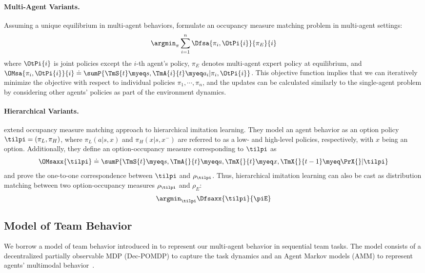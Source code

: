 \paragraph{Multi-Agent Variants.} 
Assuming a unique equilibrium in multi-agent behaviors, \citet{song2018multi} formulate an occupancy measure matching problem in multi-agent settings:
\begin{align}
   \argmin_{\pi}\sum_{i=1}^n\Dfsa{\pi_i,\OtPi{i}}{\pi_{E}}{i}  \label{eq. MAIL objective}
\end{align}
where $\OtPi{i}$ is joint policies except the $i$-th agent's policy, $\pi_E$ denotes multi-agent expert policy at equilibrium, and $\OMsa{\pi_i,\OtPi{i}}{i} \doteq \sumP{\TmS{t}\myeq s, \TmA{i}{t}\myeq a_i|\pi_i, \OtPi{i}}$. This objective function implies that we can iteratively minimize the objective with respect to individual policies $\pi_1, \cdots, \pi_n$, and the updates can be calculated similarly to the single-agent problem by considering other agents' policies as part of the environment dynamics. 

\paragraph{Hierarchical Variants.} 
\citet{jing2021adversarial} extend occupancy measure matching approach to hierarchical imitation learning.
They model an agent behavior as an option policy $\tilpi=(\pi_L, \pi_H)$, where $\pi_L(a|s, x)$ and $\pi_H(x|s, x^-)$ are referred to as a low- and high-level policies, respectively, with $x$ being an option. Additionally, they define an option-occupancy measure corresponding to $\tilpi$ as 
$$\OMsaxx{\tilpi} \doteq \sumP{\TmS{t}\myeq s, \TmA{}{t}\myeq a, \TmX{}{t}\myeq x, \TmX{}{t-1}\myeq \PrX{}|\tilpi}$$ 
and prove the one-to-one correspondence between  $\tilpi$ and $\rho_{\tilpi}$. Thus, hierarchical imitation learning can also be cast as distribution matching between two option-occupancy measures $\rho_\tilpi$ and $\rho_E$:
\begin{align}
   \argmin_{\tilpi}\Dfsaxx{\tilpi}{\piE}     \label{eq. HIL objective}
\end{align}


\subsection{Model of Team Behavior}
\label{sec. teamwork model}
We borrow a model of team behavior introduced in \cite{seo2023automated} to represent our multi-agent behavior in sequential team tasks. The model consists of a decentralized partially observable MDP (Dec-POMDP) to capture the task dynamics and an Agent Markov models (AMM) to represent agents' multimodal behavior~\cite{oliehoek2016concise, unhelkar2019learning}.

